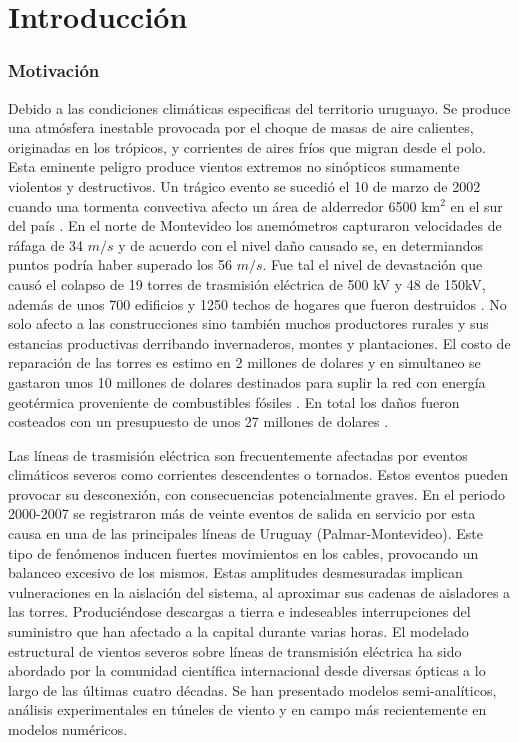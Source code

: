 \chapter{Introducción}\label{Cap:Introduccion}
 
\subsection{Motivación}
\linenumbers


Debido a las condiciones climáticas especificas del territorio uruguayo. Se produce una atmósfera inestable provocada por el choque de masas de aire calientes, originadas en los trópicos, y corrientes de aires fríos que migran desde el polo. Esta eminente peligro produce vientos extremos no sinópticos sumamente violentos y destructivos. Un trágico evento se sucedió el 10 de marzo de 2002 cuando una tormenta convectiva afecto un área de alderredor 6500 km$^2$ en el sur del país \cite{tormenta2002}. En el norte de Montevideo los anemómetros capturaron velocidades de ráfaga de 34 $m/s$ y de acuerdo con el nivel daño causado se, en determiandos puntos podría haber superado los 56 $m/s$. Fue tal el nivel de devastación que causó el colapso de 19 torres de trasmisión eléctrica de 500 kV y 48 de 150kV, además de unos 700 edificios y 1250 techos de hogares que fueron destruidos \citep{duranona2015significance}. No solo afecto a las construcciones sino también muchos productores rurales y sus estancias productivas derribando invernaderos, montes y plantaciones. El costo de reparación de las torres es estimo en 2 millones de dolares y en simultaneo se gastaron unos 10 millones de dolares destinados para suplir la red con energía geotérmica proveniente de combustibles fósiles . En total los daños fueron costeados con un presupuesto de unos 27 millones de dolares \cite{duranona2019first}.

Las líneas de trasmisión eléctrica son frecuentemente afectadas por eventos climáticos severos como corrientes descendentes o tornados. Estos eventos pueden provocar su desconexión, con consecuencias potencialmente graves. En el periodo 2000-2007 se registraron más de veinte eventos de salida en servicio por esta causa en una de las principales líneas de Uruguay (Palmar-Montevideo). Este tipo de fenómenos inducen fuertes movimientos en los cables, provocando un balanceo excesivo de los mismos. Estas amplitudes desmesuradas implican vulneraciones en la aislación del sistema, al aproximar sus cadenas de aisladores a las torres. Produciéndose descargas a tierra e indeseables interrupciones del suministro que han afectado a la capital durante varias horas. El modelado estructural de vientos severos sobre líneas de transmisión eléctrica ha sido abordado por la comunidad científica internacional desde diversas ópticas a lo largo de las últimas cuatro décadas. Se han presentado modelos semi-analíticos, análisis experimentales en túneles de viento y en campo más recientemente en modelos numéricos.
 
